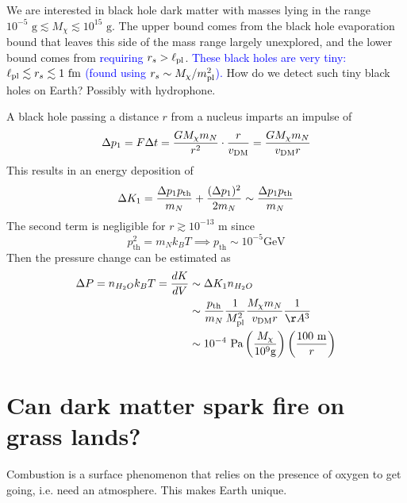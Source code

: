 \documentclass[%
 reprint,
 amsmath,amssymb,
 aps,nofootinbib
]{revtex4-1}
\begin{document}
We are interested in black hole dark matter with masses lying in the range $10^{-5}\text{ g}\lesssim M_\chi\lesssim 10^{15}\text{ g}$. The upper bound comes from the black hole evaporation bound that leaves this side of the mass range largely unexplored, and the lower bound comes from \textcolor{blue}{requiring $r_s>\ell_{\rm pl}$}. \textcolor{blue}{These black holes are very tiny: $\ell_{\rm pl}\lesssim r_s\lesssim 1\text{ fm}$ (found using $r_s\sim M_\chi/m_{\rm pl}^2$).} How do we detect such tiny black holes on Earth? Possibly with hydrophone.

A black hole passing a distance $r$ from a nucleus imparts an impulse of $$\Delta p_1 = F \Delta t = \frac{G M_\chi m_N}{r^2} \cdot \frac{r}{v_{\rm DM}} = \frac{G M_\chi m_N}{v_{\rm DM} r}$$
This results in an energy deposition of $$\Delta K_1 = \frac{\Delta p_1 p_{\rm th}}{m_N} + \frac{(\Delta p_1)^2}{2 m_N} \sim \frac{\Delta p_1 p_{\rm th}}{m_N}$$
The second term is negligible for $r \gtrsim 10^{-13} \text{ m}$ since $$p_\text{th}^2 = m_N k_B T \implies p_\text{th} \sim 10^{-5} \text{GeV}$$
Then the pressure change can be estimated as
\begin{align*}
    \Delta P = n_{H_2O} k_B T = \frac{dK}{dV} &\sim \Delta K_1 n_{H_2O} \\
    &\sim \frac{p_\text{th}}{m_N} \frac{1}{M_\text{pl}^2} \frac{M_\chi m_N}{v_{\rm DM} r} \frac{1}{\AA^3} \\
    &\sim 10^{-4} \text{ Pa} \left( \frac{M_\chi}{10^9\text {g}} \right) \left( \frac{100 \text{ m}}{r} \right)
\end{align*}



\section{Can dark matter spark fire on grass lands?}
Combustion is a surface phenomenon that relies on the presence of oxygen to get going, i.e. need an atmosphere. This makes Earth unique.
\end{document}
